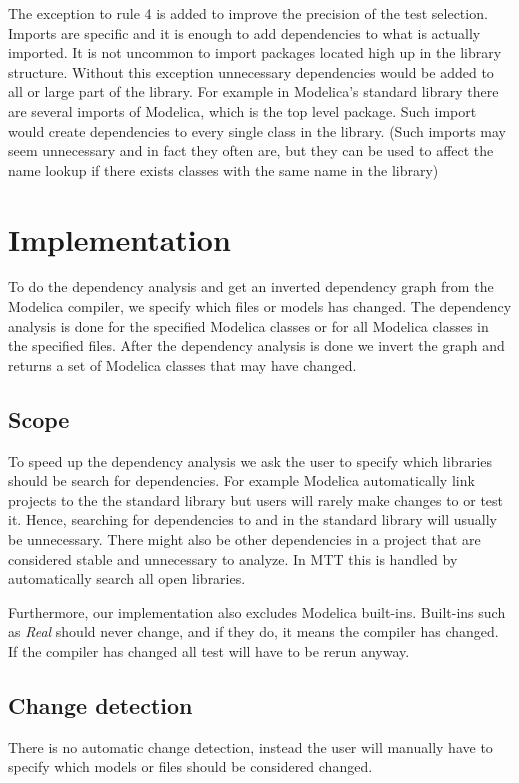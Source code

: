 \documentclass{cslthse-msc}
\begin{document}
The exception to rule 4 is added to improve the precision of the test selection. Imports are specific and it is enough to add dependencies to what is actually imported. It is not uncommon to import packages located high up in the library structure. Without this exception unnecessary dependencies would be added to all or large part of the library. For example in Modelica's standard library there are several imports of Modelica, which is the top level package. Such import would create dependencies to every single class in the library. (Such imports may seem unnecessary and in fact they often are, but they can be used to affect the name lookup if there exists classes with the same name in the library)  

\chapter[Implementation]{Implementation}
To do the dependency analysis and get an inverted dependency graph from the Modelica compiler, we specify which files or models has changed. The dependency analysis is done for the specified Modelica classes or for all Modelica classes in the specified files. After the dependency analysis is done we invert the graph and returns a set of Modelica classes that may have changed.

\section{Scope}
To speed up the dependency analysis we ask the user to specify which libraries should be search for dependencies. For example Modelica automatically link projects to the the standard library but users will rarely make changes to or test it. Hence, searching for dependencies to and in the standard library will usually be unnecessary. There might also be other dependencies in a project that are considered stable and unnecessary to analyze. In MTT this is handled by automatically search all open libraries.

Furthermore, our implementation also excludes Modelica built-ins. Built-ins such as \textit{Real} should never change, and if they do, it means the compiler has changed. If the compiler has changed all test will have to be rerun anyway.

\section{Change detection}
There is no automatic change detection, instead the user will manually have to specify which models or files should be considered changed.
\end{document}
